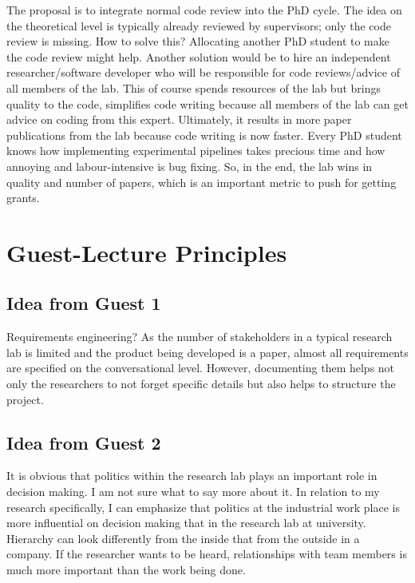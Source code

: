 \documentclass[a4paper,10pt]{article} %
\begin{document}
The proposal is to integrate normal code review into the PhD cycle. The idea on the theoretical level is typically already reviewed by supervisors; only the code review is missing. How to solve this? Allocating another PhD student to make the code review might help. Another solution would be to hire an independent researcher/software developer who will be responsible for code reviews/advice of all members of the lab. This of course spends resources of the lab but brings quality to the code, simplifies code writing because all members of the lab can get advice on coding from this expert. Ultimately, it results in more paper publications from the lab because code writing is now faster. Every PhD student knows how implementing experimental pipelines takes precious time and how annoying and labour-intensive is bug fixing.  So, in the end, the lab wins in quality and number of papers, which is an important metric to push for getting grants.



\section{Guest-Lecture Principles}

\subsection{Idea from Guest 1}

Requirements engineering? As the number of stakeholders in a typical research lab is limited and the product being developed is a paper, almost all requirements are specified on the conversational level. However, documenting them helps not only the researchers to not forget specific details but also helps to structure the project.

\subsection{Idea from Guest 2}

It is obvious that politics within the research lab plays an important role in decision making. I am not sure what to say more about it. In relation to my research specifically, I can emphasize that politics at the industrial work place is more influential on decision making that in the research lab at university. Hierarchy can look differently from the inside that from the outside in a company. If the researcher wants to be heard, relationships with team members is much more important than the work being done.
\end{document}

